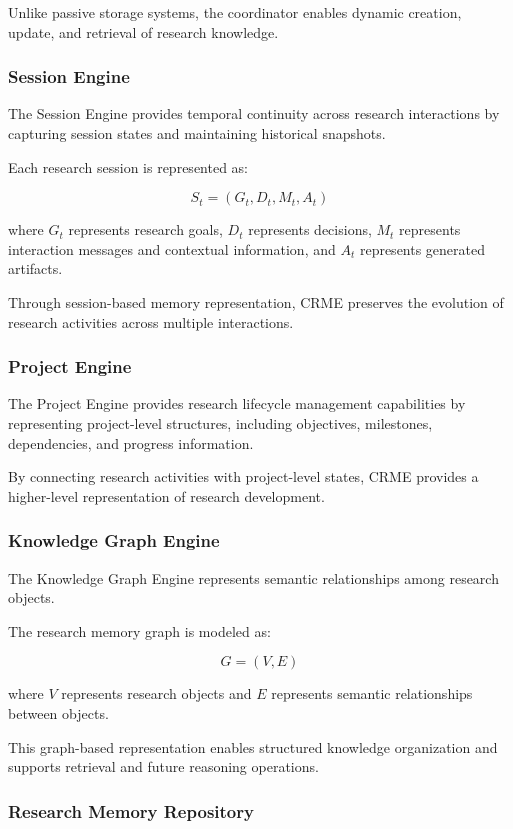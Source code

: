 Unlike passive storage systems, the coordinator enables dynamic creation, update, and retrieval of research knowledge.


\subsubsection{Session Engine}

The Session Engine provides temporal continuity across research interactions by capturing session states and maintaining historical snapshots.

Each research session is represented as:

\[
S_t =
(G_t,D_t,M_t,A_t)
\]

where $G_t$ represents research goals, $D_t$ represents decisions, $M_t$ represents interaction messages and contextual information, and $A_t$ represents generated artifacts.

Through session-based memory representation, CRME preserves the evolution of research activities across multiple interactions.


\subsubsection{Project Engine}

The Project Engine provides research lifecycle management capabilities by representing project-level structures, including objectives, milestones, dependencies, and progress information.

By connecting research activities with project-level states, CRME provides a higher-level representation of research development.


\subsubsection{Knowledge Graph Engine}

The Knowledge Graph Engine represents semantic relationships among research objects.

The research memory graph is modeled as:

\[
G=(V,E)
\]

where $V$ represents research objects and $E$ represents semantic relationships between objects.

This graph-based representation enables structured knowledge organization and supports retrieval and future reasoning operations.


\subsubsection{Research Memory Repository}

